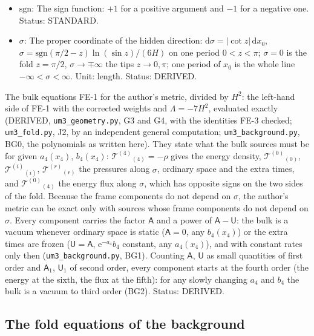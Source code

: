 \documentclass[
  10pt,
]{article}
\begin{document}
\begin{itemize}
  \(H\), \(\mathsf{U}_1 = \mathsf{U}'/H\). Unit: dimensionless. Status:
  DERIVED.
\item
  \(\mathrm{sgn}\): The sign function: \(+1\) for a positive argument
  and \(-1\) for a negative one. Status: STANDARD.
\item
  \(\sigma\): The proper coordinate of the hidden direction:
  \(\mathrm{d}\sigma = \lvert\cot z\rvert\,\mathrm{d}x_0\),
  \(\sigma = \mathrm{sgn}(\pi/2 - z)\ln(\sin z)/(6H)\) on one period
  \(0 < z < \pi\); \(\sigma = 0\) is the fold \(z = \pi/2\),
  \(\sigma \to \mp\infty\) the tips \(z \to 0, \pi\); one period of
  \(x_0\) is the whole line \(-\infty < \sigma < \infty\). Unit: length.
  Status: DERIVED.
\end{itemize}

The bulk equations FE-1 for the author's metric, divided by \(H^2\): the
left-hand side of FE-1 with the corrected weights and
\(\Lambda = -7H^2\), evaluated exactly (DERIVED,
\texttt{um3\_geometry.py}, G3 and G4, with the identities FE-3 checked;
\texttt{um3\_fold.py}, J2, by an independent general computation;
\texttt{um3\_background.py}, BG0, the polynomials as written here). They
state what the bulk sources must be for given \(a_4(x_4)\),
\(b_4(x_4)\): \(\mathcal{T}^{(4)}{}_{(4)} = -\rho\) gives the energy
density, \(\mathcal{T}^{(0)}{}_{(0)}\), \(\mathcal{T}^{(i)}{}_{(i)}\),
\(\mathcal{T}^{(r)}{}_{(r)}\) the pressures along \(\sigma\), ordinary
space and the extra times, and \(\mathcal{T}^{(0)}{}_{(4)}\) the energy
flux along \(\sigma\), which has opposite signs on the two sides of the
fold. Because the frame components do not depend on \(\sigma\), the
author's metric can be exact only with sources whose frame components do
not depend on \(\sigma\). Every component carries the factor
\(\mathsf{A}\) and a power of \(\mathsf{A} - \mathsf{U}\): the bulk is a
vacuum whenever ordinary space is static (\(\mathsf{A} = 0\), any
\(b_4(x_4)\)) or the extra times are frozen
(\(\mathsf{U} = \mathsf{A}\), \(\mathrm{e}^{-a_4}b_4\) constant, any
\(a_4(x_4)\)), and with constant rates only then
(\texttt{um3\_background.py}, BG1). Counting \(\mathsf{A}\),
\(\mathsf{U}\) as small quantities of first order and \(\mathsf{A}_1\),
\(\mathsf{U}_1\) of second order, every component starts at the fourth
order (the energy at the sixth, the flux at the fifth): for any slowly
changing \(a_4\) and \(b_4\) the bulk is a vacuum to third order (BG2).
Status: DERIVED.

\hypertarget{the-fold-equations-of-the-background}{%
\subsection{The fold equations of the
background}\label{the-fold-equations-of-the-background}}
\end{document}
